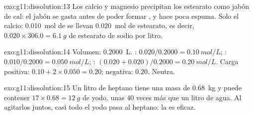 \begin{solution}{exo:g11:dissolution:13}
Los  calcio y magnesio precipitan los  estearato como jabón de
cal: el jabón se gasta antes de poder formar , y hace poca
espuma. Solo el calcio: \qty{0.010}{mol} de  se llevan
\qty{0.020}{mol} de estearato, es decir, $0.020 \times 306.0 =
\qty{6.1}{g}$ de estearato de sodio por litro.
\end{solution}

\begin{solution}{exo:g11:dissolution:14}
Volumen: \qty{0.2000}{L}. : $0.020 / 0.2000 = \qty{0.10}{mol/L}$;
: $0.010 / 0.2000 = \qty{0.050}{mol/L}$; :
$(0.020 + 0.020) / 0.2000 = \qty{0.20}{mol/L}$. Carga positiva:
$0.10 + 2 \times 0.050 = 0.20$; negativa: $0.20$. Neutra.
\end{solution}

\begin{solution}{exo:g11:dissolution:15}
Un litro de heptano tiene una masa de \qty{0.68}{kg} y puede contener
$17 \times 0.68 = \qty{12}{g}$ de yodo, unas 40 veces más que un litro
de agua. Al agitarlos juntos, casi todo el yodo pasa al heptano: la
 es eficaz.
\end{solution}

